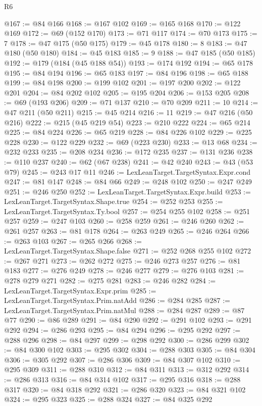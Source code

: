 \begin{lexlean}{R6}
\begin{coremodule}
@167 := @84 @166
@168 := @167 @102
@169 := @165 @168
@170 := @122 @169
@172 := @69 (@152 @170)
@173 := @71 @117
@174 := @70 @173
@175 := 7
@178 := @47 @175 (@50 @175)
@179 := @45 @178
@180 := 8
@183 := @47 @180 (@50 @180)
@184 := @45 @183
@185 := 9
@188 := @47 @185 (@50 @185)
@192 := @179 (@184 (@45 @188 @54))
@193 := @174 @192
@194 := @65 @178
@195 := @84 @194
@196 := @65 @183
@197 := @84 @196
@198 := @65 @188
@199 := @84 @198
@200 := @199 @102
@201 := @197 @200
@202 := @122 @201
@204 := @84 @202 @102
@205 := @195 @204
@206 := @153 @205
@208 := @69 (@193 @206)
@209 := @71 @137
@210 := @70 @209
@211 := 10
@214 := @47 @211 (@50 @211)
@215 := @45 @214
@216 := 11
@219 := @47 @216 (@50 @216)
@222 := @215 (@45 @219 @54)
@223 := @210 @222
@224 := @65 @214
@225 := @84 @224
@226 := @65 @219
@228 := @84 @226 @102
@229 := @225 @228
@230 := @122 @229
@232 := @69 (@223 @230)
@233 := @13 @68
@234 := @232 @233
@235 := @208 @234
@236 := @172 @235
@237 := @131 @236
@238 := @110 @237
@240 := @62 (@67 @238)
@241 := @42 @240
@243 := @43 (@53 @79)
@245 := @243 @17 @11
@246 := LexLeanTarget.TargetSyntax.Expr.cond
@247 := @81 @147
@248 := @84 @66
@249 := @248 @102
@250 := @247 @249
@251 := @246 @250
@252 := LexLeanTarget.TargetSyntax.Expr.build
@253 := LexLeanTarget.TargetSyntax.Shape.true
@254 := @252 @253
@255 := LexLeanTarget.TargetSyntax.Ty.bool
@257 := @254 @255 @102
@258 := @251 @257
@259 := @247 @103
@260 := @258 @259
@261 := @246 @260
@262 := @261 @257
@263 := @81 @178
@264 := @263 @249
@265 := @246 @264
@266 := @263 @103
@267 := @265 @266
@268 := LexLeanTarget.TargetSyntax.Shape.false
@271 := @252 @268 @255 @102
@272 := @267 @271
@273 := @262 @272
@275 := @246 @273 @257
@276 := @81 @183
@277 := @276 @249
@278 := @246 @277
@279 := @276 @103
@281 := @278 @279 @271
@282 := @275 @281
@283 := @246 @282
@284 := LexLeanTarget.TargetSyntax.Expr.prim
@285 := LexLeanTarget.TargetSyntax.Prim.natAdd
@286 := @284 @285
@287 := LexLeanTarget.TargetSyntax.Prim.natMul
@288 := @284 @287
@289 := @87 @77
@290 := @86 @289
@291 := @84 @290
@292 := @291 @102
@293 := @291 @292
@294 := @286 @293
@295 := @84 @294
@296 := @295 @292
@297 := @288 @296
@298 := @84 @297
@299 := @298 @292
@300 := @286 @299
@302 := @84 @300 @102
@303 := @295 @302
@304 := @288 @303
@305 := @84 @304
@306 := @305 @292
@307 := @286 @306
@309 := @84 @307 @102
@310 := @295 @309
@311 := @288 @310
@312 := @84 @311
@313 := @312 @292
@314 := @286 @313
@316 := @84 @314 @102
@317 := @295 @316
@318 := @288 @317
@320 := @84 @318 @292
@321 := @286 @320
@323 := @84 @321 @102
@324 := @295 @323
@325 := @288 @324
@327 := @84 @325 @292

\end{coremodule}
\end{lexlean}
